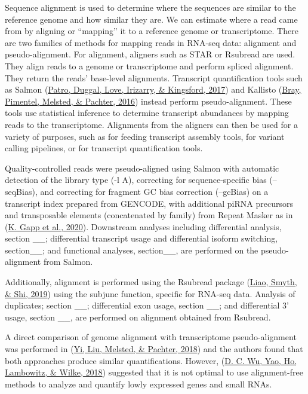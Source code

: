 \documentclass[12pt,twoside]{reedthesis}
\begin{document}
Sequence alignment is used to determine where the sequences are similar
to the reference genome and how similar they are. We can estimate where
a read came from by aligning or ``mapping'' it to a reference genome or
transcriptome. There are two families of methods for mapping reads in
RNA-seq data: alignment and pseudo-alignment. For alignment, aligners
such as STAR or Rsubread are used. They align reads to a genome or
transcriptome and perform spliced alignment. They return the reads'
base-level alignments. Transcript quantification tools such as Salmon
(\protect\hyperlink{ref-patro2017}{Patro, Duggal, Love, Irizarry, \& Kingsford, 2017}) and Kallisto (\protect\hyperlink{ref-bray2016}{Bray, Pimentel, Melsted, \& Pachter, 2016}) instead perform pseudo-alignment.
These tools use statistical inference to determine transcript abundances
by mapping reads to the transcriptome. Alignments from the aligners can
then be used for a variety of purposes, such as for feeding transcript
assembly tools, for variant calling pipelines, or for transcript
quantification tools.

Quality-controlled reads were pseudo-aligned using Salmon with automatic
detection of the library type (-l A), correcting for sequence-specific
bias (--seqBias), and correcting for fragment GC bias correction
(--gcBias) on a transcript index prepared from GENCODE, with additional
piRNA precursors and transposable elements (concatenated by family) from
Repeat Masker as in (\protect\hyperlink{ref-gapp2020}{K. Gapp et al., 2020}). Downstream analyses including
differential analysis, section \_\_; differential transcript usage and
differential isoform switching, section\_\_; and functional analyses,
section\_\_, are performed on the pseudo-alignment from Salmon.

Additionally, alignment is performed using the Rsubread package
(\protect\hyperlink{ref-liao2019}{Liao, Smyth, \& Shi, 2019}) using the subjunc function, specific for RNA-seq data.
Analysis of duplicates; section \_\_; differential exon usage, section
\_\_; and differential 3' usage, section \_\_, are performed on
alignment obtained from Rsubread.

A direct comparison of genome alignment with transcriptome
pseudo-alignment was performed in (\protect\hyperlink{ref-yi2018}{Yi, Liu, Melsted, \& Pachter, 2018}) and the authors found that
both approaches produce similar quantifications. However, (\protect\hyperlink{ref-wu2018}{D. C. Wu, Yao, Ho, Lambowitz, \& Wilke, 2018})
suggested that it is not optimal to use alignment-free methods to
analyze and quantify lowly expressed genes and small RNAs.
\end{document}
